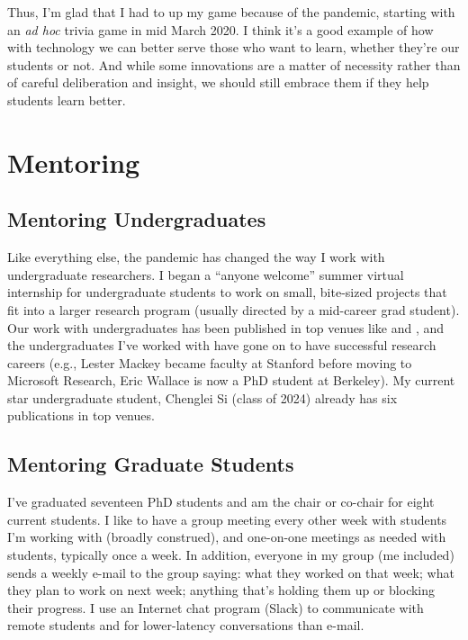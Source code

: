 
Thus, I'm glad that I had to up my game because of the pandemic,
starting with an \textit{ad hoc} trivia game in mid March 2020.  I
think it's a good example of how with technology we can better serve
those who want to learn, whether they're our students or not.  And
while some innovations are a matter of necessity rather than of
careful deliberation and insight, we should still embrace them if they
help students learn better.

\section{Mentoring}

\subsection{Mentoring Undergraduates}

Like everything else, the pandemic has changed the way I work with
undergraduate researchers.
%
I began a ``anyone welcome'' summer virtual internship for
undergraduate students to work on small, bite-sized projects that fit
into a larger research program (usually directed by a mid-career grad
student).
%
Our work with undergraduates has been published in top venues like
 and , and the undergraduates I've worked with
have gone on to have successful research careers (e.g., Lester Mackey
became faculty at Stanford before moving to Microsoft Research, Eric
Wallace is now a PhD student at Berkeley).
%
My current star undergraduate student, Chenglei Si (class of 2024) already
has six publications in top venues.

\subsection{Mentoring Graduate Students}

I've graduated seventeen PhD students and am the chair or co-chair for
eight current students.  I like to have a group meeting every other
week with students I'm working with (broadly construed), and
one-on-one meetings as needed with students, typically once a week. In
addition, everyone in my group (me included) sends a weekly e-mail to
the group saying: what they worked on that week; what they plan to work
on next week; anything that's holding them up or blocking their
progress. I use an Internet chat program (Slack) to communicate with remote
students and for lower-latency conversations than e-mail.

